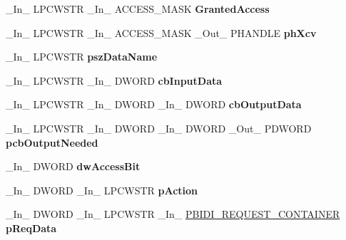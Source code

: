 \begin{DoxyCompactItemize}
\+\_\+\+In\+\_\+ L\+P\+C\+W\+S\+TR \+\_\+\+In\+\_\+ A\+C\+C\+E\+S\+S\+\_\+\+M\+A\+SK {\bfseries Granted\+Access}
\item 
\mbox{\label{struct___m_o_n_i_t_o_r2_a6a99ea02b9bc6fcf6e378b2d29871a9c}} 
\+\_\+\+In\+\_\+ L\+P\+C\+W\+S\+TR \+\_\+\+In\+\_\+ A\+C\+C\+E\+S\+S\+\_\+\+M\+A\+SK \+\_\+\+Out\+\_\+ P\+H\+A\+N\+D\+LE {\bfseries ph\+Xcv}
\item 
\mbox{\label{struct___m_o_n_i_t_o_r2_a24feb9847bc359335915772942380d7e}} 
\+\_\+\+In\+\_\+ L\+P\+C\+W\+S\+TR {\bfseries psz\+Data\+Name}
\item 
\mbox{\label{struct___m_o_n_i_t_o_r2_a4e2b09ac842915cd56088bfb9d1e8230}} 
\+\_\+\+In\+\_\+ L\+P\+C\+W\+S\+TR \+\_\+\+In\+\_\+ D\+W\+O\+RD {\bfseries cb\+Input\+Data}
\item 
\mbox{\label{struct___m_o_n_i_t_o_r2_a60b9b6f7b811be1af389b3f6a1e14e6b}} 
\+\_\+\+In\+\_\+ L\+P\+C\+W\+S\+TR \+\_\+\+In\+\_\+ D\+W\+O\+RD \+\_\+\+In\+\_\+ D\+W\+O\+RD {\bfseries cb\+Output\+Data}
\item 
\mbox{\label{struct___m_o_n_i_t_o_r2_aebb8a184cbb8b5616ba208331b10a800}} 
\+\_\+\+In\+\_\+ L\+P\+C\+W\+S\+TR \+\_\+\+In\+\_\+ D\+W\+O\+RD \+\_\+\+In\+\_\+ D\+W\+O\+RD \+\_\+\+Out\+\_\+ P\+D\+W\+O\+RD {\bfseries pcb\+Output\+Needed}
\item 
\mbox{\label{struct___m_o_n_i_t_o_r2_a2aae7df98020db763b7f5652d59419f1}} 
\+\_\+\+In\+\_\+ D\+W\+O\+RD {\bfseries dw\+Access\+Bit}
\item 
\mbox{\label{struct___m_o_n_i_t_o_r2_ac386d76228647828981a7e4404b95a9c}} 
\+\_\+\+In\+\_\+ D\+W\+O\+RD \+\_\+\+In\+\_\+ L\+P\+C\+W\+S\+TR {\bfseries p\+Action}
\item 
\mbox{\label{struct___m_o_n_i_t_o_r2_a2baddf506d75760bb05c7eab09c8761c}} 
\+\_\+\+In\+\_\+ D\+W\+O\+RD \+\_\+\+In\+\_\+ L\+P\+C\+W\+S\+TR \+\_\+\+In\+\_\+ \hyperlink{struct___b_i_d_i___r_e_q_u_e_s_t___c_o_n_t_a_i_n_e_r}{P\+B\+I\+D\+I\+\_\+\+R\+E\+Q\+U\+E\+S\+T\+\_\+\+C\+O\+N\+T\+A\+I\+N\+ER} {\bfseries p\+Req\+Data}

\end{DoxyCompactItemize}
